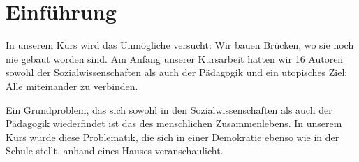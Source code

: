\section[Einführung]{Einführung}

In unserem Kurs wird das Unmögliche versucht:
Wir bauen Brücken, wo sie noch nie gebaut worden sind.
Am Anfang unserer Kursarbeit hatten wir 16 Autoren sowohl der Sozialwissenschaften als auch der Pädagogik und ein utopisches Ziel:
Alle miteinander zu verbinden.

Ein Grundproblem, das sich sowohl in den Sozialwissenschaften als auch der Pädagogik wiederfindet ist das des menschlichen Zusammenlebens.
In unserem Kurs wurde diese Problematik, die sich in einer Demokratie ebenso wie in der Schule stellt, anhand eines Hauses veranschaulicht.

